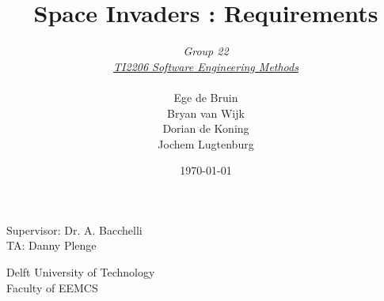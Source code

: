 \documentclass[10pt]{article}
\begin{document}
\title{Space Invaders : Requirements}
\date{\today}
\author{\textit{Group 22}\\ \textit{\underline{TI2206 Software Engineering Methods}} \\
 \\Ege de Bruin \\ Bryan van Wijk \\ Dorian de Koning \\ Jochem Lugtenburg }
 \maketitle  
 \begin{center}
Supervisor: Dr. A. Bacchelli\\
TA: Danny Plenge\\
 \end{center}     
 \begin{center}
 Delft University of Technology\\
 Faculty of EEMCS\\
 \end{center}
 \thispagestyle{empty}
 \pagebreak
 
 \tableofcontents
 
 \pagebreak

 







\end{document}
